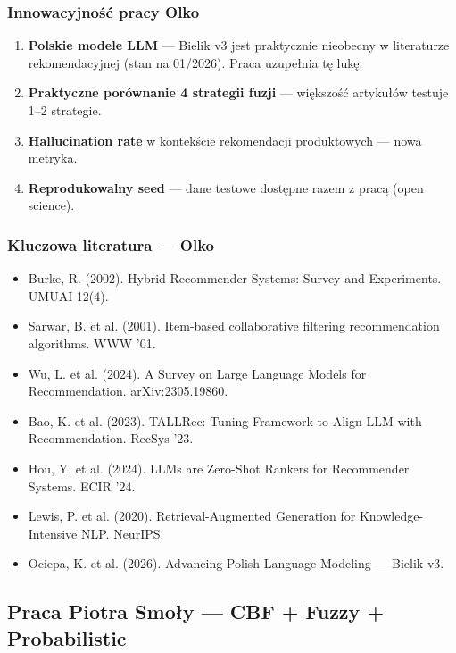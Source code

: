 \documentclass[a4paper,11pt]{article}
\begin{document}
\subsubsection*{Innowacyjność pracy Olko}

\begin{enumerate}[leftmargin=1.5em,itemsep=2pt]
  \item \textbf{Polskie modele LLM} --- Bielik v3 jest praktycznie nieobecny w literaturze rekomendacyjnej (stan na 01/2026). Praca uzupełnia tę lukę.
  \item \textbf{Praktyczne porównanie 4 strategii fuzji} --- większość artykułów testuje 1--2 strategie.
  \item \textbf{Hallucination rate} w kontekście rekomendacji produktowych --- nowa metryka.
  \item \textbf{Reprodukowalny seed} --- dane testowe dostępne razem z pracą (open science).
\end{enumerate}

\subsubsection*{Kluczowa literatura --- Olko}

\begin{itemize}[leftmargin=1.5em,itemsep=1pt]
  \item Burke, R. (2002). Hybrid Recommender Systems: Survey and Experiments. UMUAI 12(4).
  \item Sarwar, B. et al. (2001). Item-based collaborative filtering recommendation algorithms. WWW '01.
  \item Wu, L. et al. (2024). A Survey on Large Language Models for Recommendation. arXiv:2305.19860.
  \item Bao, K. et al. (2023). TALLRec: Tuning Framework to Align LLM with Recommendation. RecSys '23.
  \item Hou, Y. et al. (2024). LLMs are Zero-Shot Rankers for Recommender Systems. ECIR '24.
  \item Lewis, P. et al. (2020). Retrieval-Augmented Generation for Knowledge-Intensive NLP. NeurIPS.
  \item Ociepa, K. et al. (2026). Advancing Polish Language Modeling --- Bielik v3.
\end{itemize}

\newpage
\subsection{Praca Piotra Smoły --- CBF + Fuzzy + Probabilistic}
\end{document}
